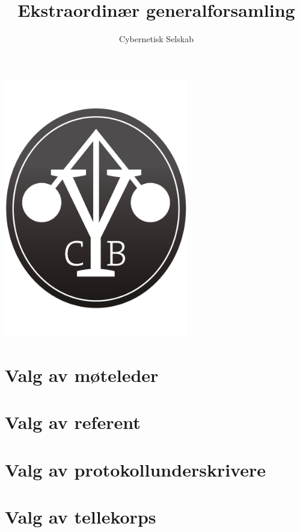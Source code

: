 \documentclass[10pt,norsk,a4paper,usenames,dvipsnames]{article}
\title{\huge Ekstraordinær generalforsamling}
\author{\LARGE Cybernetisk Selskab}
\begin{document}
\maketitle



\begin{center}


\includegraphics[width=0.6\textwidth,height=0.6\textheight,keepaspectratio=true]{cyblogoa3.pdf}

\end{center}


\newpage


\tableofcontents

\section{Valg av møteleder}


\section{Valg av referent}


\section{Valg av protokollunderskrivere}


\section{Valg av tellekorps}
\end{document}
